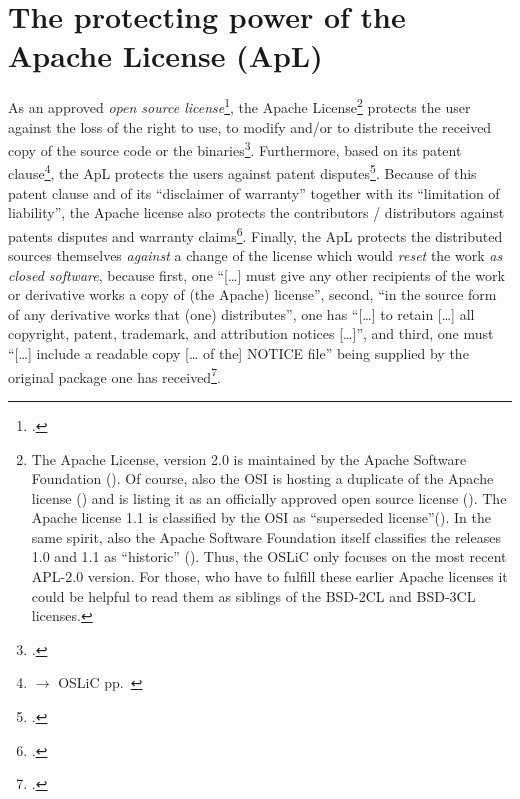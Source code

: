 \section{The protecting power of the Apache License (ApL)}
\label{sec:ProtectPowerOfApL}

As an approved \emph{open source license}\footcite[cf.][\nopage wp]{OSI2012b},
the Apache License\footnote{The Apache License, version 2.0 is maintained by the
Apache Software Foundation (\cite[cf.][\nopage wp]{AsfApacheLicense20a}).  Of
course, also the OSI is hosting a duplicate of the Apache license
(\cite[cf.][\nopage wp]{Apl20OsiLicense2004a}) and is listing it as an
officially approved open source license (\cite[cf.][\nopage wp]{OSI2012b}). The
Apache license 1.1 is classified by the OSI as \enquote{superseded
license}(\cite[cf.][\nopage wp]{OSI2013b}). In the same spirit, also the Apache
Software Foundation itself classifies the releases 1.0 and 1.1 as
\enquote{historic} (\cite[cf.][\nopage wp]{AsfLicenses2013a}). Thus, the OSLiC
only focuses on the most recent APL-2.0 version. For those, who have to fulfill
these earlier Apache licenses it could be helpful to read them as siblings of
the BSD-2CL and BSD-3CL licenses.} protects the user against the loss of the
right to use, to modify and/or to distribute the received copy of the source
code or the binaries\footcite[cf.][\nopage wp §2]{Apl20OsiLicense2004a}.
Furthermore, based on its patent clause\footnote{$\rightarrow$ OSLiC pp.\
\pageref{subsec:ApLPatentClause}}, the ApL protects the users against patent
disputes\footcite[cf.][\nopage wp §3]{Apl20OsiLicense2004a}. Because of this
patent clause and of its \enquote{disclaimer of warranty} together with its
\enquote{limitation of liability}, the Apache license also protects the
contributors / distributors against patents disputes and warranty
claims\footcite[cf.][\nopage wp §3, §7, §8]{Apl20OsiLicense2004a}. Finally, the
ApL protects the distributed sources themselves \emph{against} a change of the
license which would \emph{reset} the work \emph{as closed software}, because
first, one \enquote{[\ldots] must give any other recipients of the work or
derivative works a copy of (the Apache) license}, second, \enquote{in the source
form of any derivative works that (one) distributes}, one has \enquote{[\ldots]
to retain [\ldots] all copyright, patent, trademark, and attribution notices
[\ldots]}, and third, one must \enquote{[\ldots] include a readable copy [\ldots
of the] NOTICE file} being supplied by the original package one has
received\footcite[cf.][\nopage wp §4]{Apl20OsiLicense2004a}.

